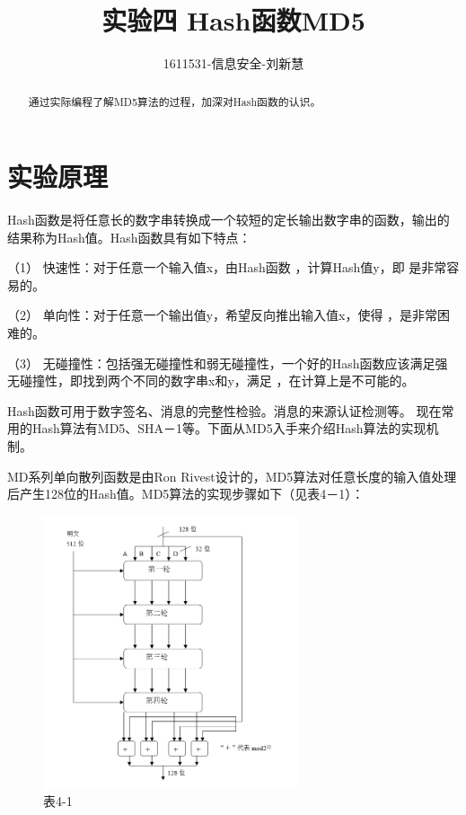 \documentclass[UTF8,a4paper]{article}
\title{实验四 Hash函数MD5}
\author{1611531-信息安全-刘新慧}
\date{}
\begin{document}
\maketitle

\begin{abstract}
通过实际编程了解MD5算法的过程，加深对Hash函数的认识。\par 
\end{abstract}
\tableofcontents
\newpage

	\section{实验原理}
Hash函数是将任意长的数字串转换成一个较短的定长输出数字串的函数，输出的结果称为Hash值。Hash函数具有如下特点：\par
（1）	快速性：对于任意一个输入值x，由Hash函数 ，计算Hash值y，即 是非常容易的。\par 
（2）	单向性：对于任意一个输出值y，希望反向推出输入值x，使得 ，是非常困难的。\par 
（3）	无碰撞性：包括强无碰撞性和弱无碰撞性，一个好的Hash函数应该满足强无碰撞性，即找到两个不同的数字串x和y，满足 ，在计算上是不可能的。\par 
Hash函数可用于数字签名、消息的完整性检验。消息的来源认证检测等。
现在常用的Hash算法有MD5、SHA－1等。下面从MD5入手来介绍Hash算法的实现机制。\par 
MD系列单向散列函数是由Ron Rivest设计的，MD5算法对任意长度的输入值处理后产生128位的Hash值。MD5算法的实现步骤如下（见表4－1）：\par 
	\begin{figure}[!ht]
	
	\centering
	\includegraphics[width=0.67\textwidth]{table1.PNG}
	\caption{表4-1}
	\label{fig:table1}
\end{figure}
\end{document}
